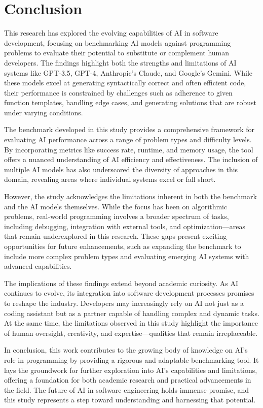 \section{Conclusion}

This research has explored the evolving capabilities of AI in software development, focusing on benchmarking AI models against programming problems to evaluate their potential to substitute or complement human developers. The findings highlight both the strengths and limitations of AI systems like GPT-3.5, GPT-4, Anthropic’s Claude, and Google’s Gemini. While these models excel at generating syntactically correct and often efficient code, their performance is constrained by challenges such as adherence to given function templates, handling edge cases, and generating solutions that are robust under varying conditions.

The benchmark developed in this study provides a comprehensive framework for evaluating AI performance across a range of problem types and difficulty levels. By incorporating metrics like success rate, runtime, and memory usage, the tool offers a nuanced understanding of AI efficiency and effectiveness. The inclusion of multiple AI models has also underscored the diversity of approaches in this domain, revealing areas where individual systems excel or fall short.

However, the study acknowledges the limitations inherent in both the benchmark and the AI models themselves. While the focus has been on algorithmic problems, real-world programming involves a broader spectrum of tasks, including debugging, integration with external tools, and optimization—areas that remain underexplored in this research. These gaps present exciting opportunities for future enhancements, such as expanding the benchmark to include more complex problem types and evaluating emerging AI systems with advanced capabilities.

The implications of these findings extend beyond academic curiosity. As AI continues to evolve, its integration into software development processes promises to reshape the industry. Developers may increasingly rely on AI not just as a coding assistant but as a partner capable of handling complex and dynamic tasks. At the same time, the limitations observed in this study highlight the importance of human oversight, creativity, and expertise—qualities that remain irreplaceable.

In conclusion, this work contributes to the growing body of knowledge on AI’s role in programming by providing a rigorous and adaptable benchmarking tool. It lays the groundwork for further exploration into AI’s capabilities and limitations, offering a foundation for both academic research and practical advancements in the field. The future of AI in software engineering holds immense promise, and this study represents a step toward understanding and harnessing that potential.
